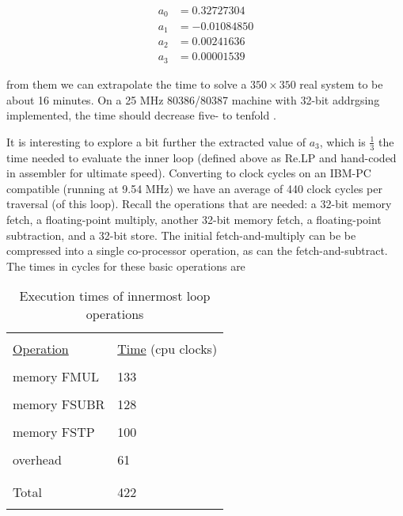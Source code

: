 \begin{equation*}
	\begin{split}
		a_0 &= 0.32727304\\
		a_1 &= -0.01084850\\
		a_2 &= 0.00241636\\
		a_3 &= 0.00001539
	\end{split}
\end{equation*}

from them we can extrapolate the time to solve a $350 \times 350$ real
system to be about 16 minutes. On a 25 MHz 80386/80387 machine with 32-bit addrgsing implemented, the time should
decrease five- to tenfold .

It is interesting to explore a bit further the extracted value of $a_3$,
which is $\frac{1}{3}$ the time needed to evaluate the inner loop (defined
above as Re.LP and hand-coded in assembler for ultimate
speed). Converting to clock cycles on an IBM-PC compatible
(running at 9.54 MHz) we have an average of 440 clock cycles per
traversal (of this loop). Recall the operations that are needed: a
32-bit memory fetch, a floating-point multiply, another 32-bit
memory fetch, a floating-point subtraction, and a 32-bit store.
The initial fetch-and-multiply can be be compressed into a single
co-processor operation, as can the fetch-and-subtract. The times
in cycles for these basic operations are
\begin{table}
	\centering
	\caption{Execution times of innermost loop operations}
	    \bigskip
    \label{tbl:09_02} 
	\setlength{\tabcolsep}{10pt}
        \begin{tabular}{|ll|}
			\hline &  \\
			\underline{Operation} & \underline{Time} \; (cpu clocks)\\
			&  \\
			memory FMUL &  133  \\
			&  \\
			memory FSUBR &  128  \\
			&  \\
			memory FSTP &  100  \\ 
			&  \\
			overhead &  61  \\ 
			&  \\
            \hline &  \\
			Total &  422  \\ 
			&  \\
            \hline
        \end{tabular}
\end{table}
 

